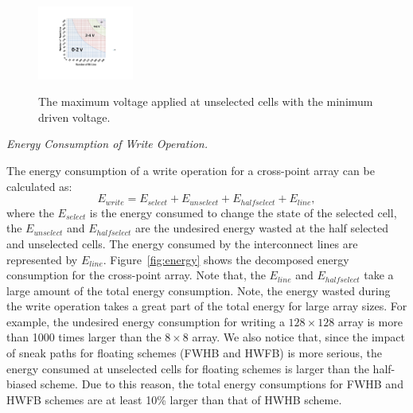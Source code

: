 \begin{figure}%
\centering
  \includegraphics[width=0.28\textwidth]{./figures/Theoretical_bound2.pdf}\\
  \caption{The maximum voltage applied at unselected cells with the minimum driven voltage.}\label{fig:half}
  \vspace{-10pt}
\end{figure}



\vspace{6pt} \emph{Energy Consumption of Write Operation.} \vspace{6pt}

The energy consumption of a write operation for a cross-point array can be calculated as:
\begin{equation}
E_{write} = E_{select} + E_{unselect} + E_{halfselect} + E_{line},
\end{equation}
where the $E_{select}$ is the energy consumed to change the state of the
selected cell, the $E_{unselect}$ and $E_{halfselect}$ are the undesired energy wasted at the half selected and unselected cells. The energy consumed by the interconnect lines are represented by $E_{line}$. Figure~\ref{fig:energy} shows the decomposed energy consumption for the cross-point array. Note that, the $E_{line}$ and $E_{halfselect}$ take a large amount of the total energy consumption. Note, the energy wasted during the write operation takes a great part of the total energy for large array sizes. For example, the undesired energy consumption for writing a $128{\times}128$ array is more than 1000 times larger than the $8{\times}8$ array. We also notice that, since the impact of sneak paths for floating schemes (FWHB and HWFB) is more serious, the energy consumed at unselected cells for floating schemes is larger than the half-biased scheme. Due to this reason, the total energy consumptions for FWHB and HWFB schemes are at least 10\% larger than that of HWHB scheme.



